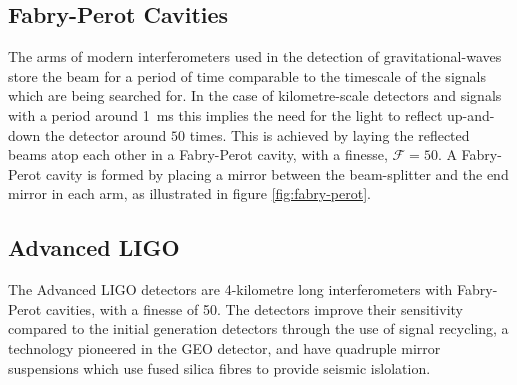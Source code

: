 \subsection{Fabry-Perot Cavities}
\label{sec:fabry-perot-cavities}
%
%
The arms of modern interferometers used in the detection of
gravitational-waves store the beam for a period of time comparable to
the timescale of the signals which are being searched for. In the case
of kilometre-scale detectors and signals with a period around
\SI{1}{\milli\second} this implies the need for the light to reflect
up-and-down the detector around $50$ times. This is achieved by laying
the reflected beams atop each other in a Fabry-Perot cavity, with a
\gls{finesse}, $\mathcal{F}=50$. A Fabry-Perot cavity is formed by
placing a mirror between the beam-splitter and the end mirror in each
arm, as illustrated in figure \ref{fig:fabry-perot}.

\subsection{Advanced LIGO}
\label{sec:advanced-ligo}

The Advanced LIGO detectors are 4-kilometre long interferometers with
Fabry-Perot cavities, with a finesse of 50. The detectors improve
their sensitivity compared to the initial generation detectors through
the use of signal recycling, a technology pioneered in the GEO
detector, and have quadruple mirror suspensions which use fused silica
fibres to provide seismic
islolation\cite{2002CQGra..19.4043R,2012CQGra..29w5004A}.


